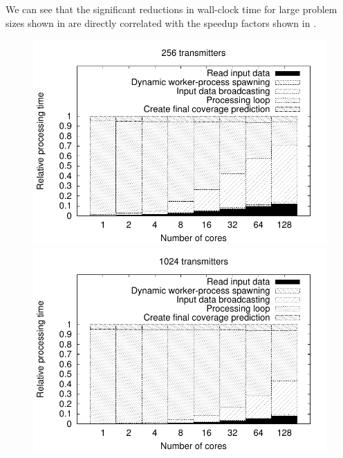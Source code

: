 We can see that the significant reductions in wall-clock time for
large problem sizes shown in 
are directly correlated with the speedup factors shown in .

\begin{figure}
\begin{minipage}[t]{0.31\textwidth}%
\centering

\includegraphics[width=1\columnwidth]{04-framework_design_and_implementation/img/strong_scaling-relative_time_plot_256}%
\end{minipage}\qquad{}%
\begin{minipage}[t]{0.31\textwidth}%
\centering

\includegraphics[width=1\columnwidth]{04-framework_design_and_implementation/img/strong_scaling-relative_time_plot_1024}%
\end{minipage}\qquad{}%
\begin{minipage}[t]{0.31\textwidth}%
\centering


\end{minipage}
\end{figure}
